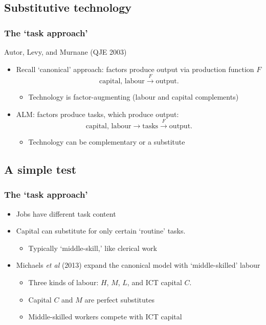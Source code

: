 \documentclass[red]{beamer}
\newcommand{\vitem}{\vfill\item}
\begin{document}
\subsection{Substitutive technology}
\begin{frame}[c]
\frametitle{The `task approach'}
Autor, Levy, and Murnane (QJE 2003)
\vfill
\begin{itemize}
\item Recall `canonical' approach: factors produce output via 
       production function $F$
\[ \text{capital, labour} \overset{F}{\longrightarrow} \text{output}. \]
\begin{itemize}
\item Technology is factor-augmenting (labour and capital complements)
\vfill
\end{itemize}
\pause
\vitem ALM: factors produce tasks, which produce output:
\[ \text{capital, labour} \longrightarrow \text{tasks} \overset{F}{\longrightarrow} \text{output}. \]
\begin{itemize}
\item Technology can be complementary or a substitute
\end{itemize}
\end{itemize}
\end{frame}

\subsection{A simple test}
\begin{frame}
\frametitle{The `task approach'}
\begin{itemize}
\vitem Jobs have different task content
\vitem Capital can substitute for only certain `routine' tasks.
  \begin{itemize}
  \item Typically `middle-skill,' like clerical work
  \end{itemize}
\vitem Michaels {\em et al} (2013) expand the canonical model with `middle-skilled' labour
  \begin{itemize}
  \item Three kinds of labour: $H$, $M$, $L$, and ICT capital $C$. 
  \item Capital $C$ and $M$ are perfect substitutes
  \item Middle-skilled workers compete with ICT capital
  \end{itemize}
\end{itemize}
\end{frame}
\end{document}
